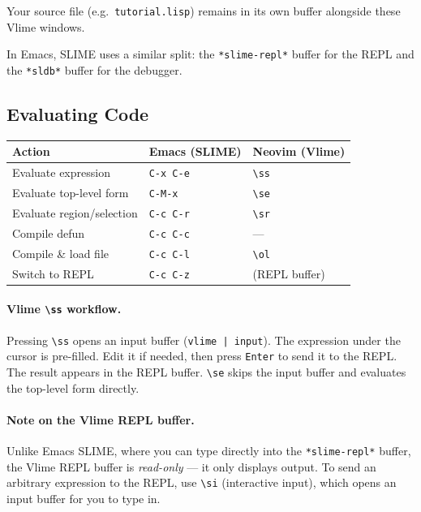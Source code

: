 \documentclass[a4paper,11pt]{article}
\newcommand{\key}[1]{\texttt{#1}}
\newcommand{\file}[1]{\texttt{#1}}
\begin{document}
Your source file (e.g.\ \file{tutorial.lisp}) remains in its own buffer
alongside these Vlime windows.

In Emacs, SLIME uses a similar split: the \texttt{*slime-repl*} buffer for the
REPL and the \texttt{*sldb*} buffer for the debugger.

\subsection{Evaluating Code}

\begin{center}
\begin{tabular}{lll}
  \toprule
  \textbf{Action} & \textbf{Emacs (SLIME)} & \textbf{Neovim (Vlime)} \\
  \midrule
  Evaluate expression      & \key{C-x C-e}  & \key{\textbackslash ss} \\
  Evaluate top-level form   & \key{C-M-x}    & \key{\textbackslash se} \\
  Evaluate region/selection & \key{C-c C-r}  & \key{\textbackslash sr} \\
  Compile defun             & \key{C-c C-c}  & --- \\
  Compile \& load file      & \key{C-c C-l}  & \key{\textbackslash ol} \\
  Switch to REPL            & \key{C-c C-z}  & (REPL buffer) \\
  \bottomrule
\end{tabular}
\end{center}

\paragraph{Vlime \key{\textbackslash ss} workflow.}
Pressing \key{\textbackslash ss} opens an input buffer (\texttt{vlime | input}).
The expression under the cursor is pre-filled.
Edit it if needed, then press \key{Enter} to send it to the REPL.
The result appears in the REPL buffer.
\key{\textbackslash se} skips the input buffer and evaluates the top-level
form directly.

\paragraph{Note on the Vlime REPL buffer.}
Unlike Emacs SLIME, where you can type directly into the \texttt{*slime-repl*}
buffer, the Vlime REPL buffer is \emph{read-only} --- it only displays output.
To send an arbitrary expression to the REPL, use \key{\textbackslash si}
(interactive input), which opens an input buffer for you to type in.
\end{document}

